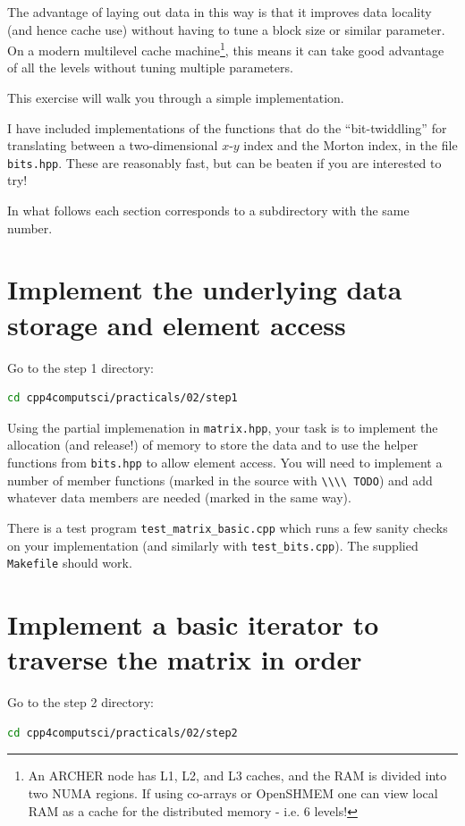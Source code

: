 \documentclass{article}
\newcommand{\code}[1]{\lstinline!#1!}
\begin{document}
The advantage of laying out data in this way is that it improves data
locality (and hence cache use) without having to tune a block size or
similar parameter. On a modern multilevel cache machine\footnote{An
  ARCHER node has L1, L2, and L3 caches, and the RAM is divided into
  two NUMA regions. If using co-arrays or OpenSHMEM one can view local
  RAM as a cache for the distributed memory - i.e. 6 levels!}, this
means it can take good advantage of all the levels without tuning
multiple parameters.

This exercise will walk you through a simple implementation.

I have included implementations of the functions that do the
``bit-twiddling'' for translating between a two-dimensional $x$-$y$
index and the Morton index, in the file \verb!bits.hpp!. These are
reasonably fast, but can be beaten if you are interested to try! 

In what follows each section corresponds to a subdirectory with the
same number.

\section{Implement the underlying data storage and element access}
Go to the step 1 directory:
\begin{lstlisting}[language=bash]
cd cpp4computsci/practicals/02/step1
\end{lstlisting}

Using the partial implemenation in \verb!matrix.hpp!, your task is to
implement the allocation (and release!) of memory to store the data
and to use the helper functions from \verb!bits.hpp! to allow element
access. You will need to implement a number of member functions
(marked in the source with \code{\\\\ TODO}) and add whatever data
members are needed (marked in the same way).

There is a test program \verb!test_matrix_basic.cpp! which runs a few
sanity checks on your implementation (and similarly with
\verb!test_bits.cpp!). The supplied \verb!Makefile! should work.

\section{Implement a basic iterator to traverse the matrix in order}

Go to the step 2 directory:
\begin{lstlisting}[language=bash]
cd cpp4computsci/practicals/02/step2
\end{lstlisting}
\end{document}
